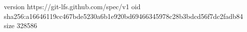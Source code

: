 version https://git-lfs.github.com/spec/v1
oid sha256:a16646119cc467bde5230a6b1e920bd69466345978c28b3bdcd56f7dc2fadb84
size 328586
